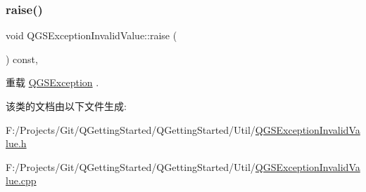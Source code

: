 \subsubsection{\texorpdfstring{raise()}{raise()}}
{\footnotesize\ttfamily void Q\+G\+S\+Exception\+Invalid\+Value\+::raise (\begin{DoxyParamCaption}{ }\end{DoxyParamCaption}) const\hspace{0.3cm}{\ttfamily [override]}, {\ttfamily [virtual]}}



重载 \mbox{\hyperlink{class_q_g_s_exception_a78e6d3c9f92bbc94440d4c2e946beed2}{Q\+G\+S\+Exception}} .



该类的文档由以下文件生成\+:\begin{DoxyCompactItemize}
\item 
F\+:/\+Projects/\+Git/\+Q\+Getting\+Started/\+Q\+Getting\+Started/\+Util/\mbox{\hyperlink{_q_g_s_exception_invalid_value_8h}{Q\+G\+S\+Exception\+Invalid\+Value.\+h}}\item 
F\+:/\+Projects/\+Git/\+Q\+Getting\+Started/\+Q\+Getting\+Started/\+Util/\mbox{\hyperlink{_q_g_s_exception_invalid_value_8cpp}{Q\+G\+S\+Exception\+Invalid\+Value.\+cpp}}\end{DoxyCompactItemize}
